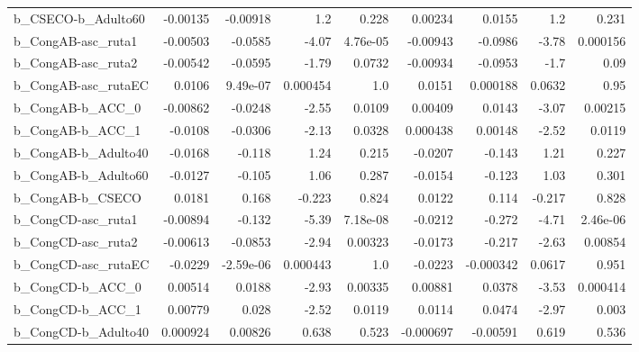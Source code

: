 \begin{tabular}{lrrrrrrrr}
b\_CSECO-b\_Adulto60         &    -0.00135 &     -0.00918 &       1.2 &    0.228 &    0.00234 &      0.0155 &          1.2 &         0.231 \\
b\_CongAB-asc\_ruta1         &    -0.00503 &      -0.0585 &     -4.07 & 4.76e-05 &   -0.00943 &     -0.0986 &        -3.78 &      0.000156 \\
b\_CongAB-asc\_ruta2         &    -0.00542 &      -0.0595 &     -1.79 &   0.0732 &   -0.00934 &     -0.0953 &         -1.7 &          0.09 \\
b\_CongAB-asc\_rutaEC        &      0.0106 &     9.49e-07 &  0.000454 &      1.0 &     0.0151 &    0.000188 &       0.0632 &          0.95 \\
b\_CongAB-b\_ACC\_0           &    -0.00862 &      -0.0248 &     -2.55 &   0.0109 &    0.00409 &      0.0143 &        -3.07 &       0.00215 \\
b\_CongAB-b\_ACC\_1           &     -0.0108 &      -0.0306 &     -2.13 &   0.0328 &   0.000438 &     0.00148 &        -2.52 &        0.0119 \\
b\_CongAB-b\_Adulto40        &     -0.0168 &       -0.118 &      1.24 &    0.215 &    -0.0207 &      -0.143 &         1.21 &         0.227 \\
b\_CongAB-b\_Adulto60        &     -0.0127 &       -0.105 &      1.06 &    0.287 &    -0.0154 &      -0.123 &         1.03 &         0.301 \\
b\_CongAB-b\_CSECO           &      0.0181 &        0.168 &    -0.223 &    0.824 &     0.0122 &       0.114 &       -0.217 &         0.828 \\
b\_CongCD-asc\_ruta1         &    -0.00894 &       -0.132 &     -5.39 & 7.18e-08 &    -0.0212 &      -0.272 &        -4.71 &      2.46e-06 \\
b\_CongCD-asc\_ruta2         &    -0.00613 &      -0.0853 &     -2.94 &  0.00323 &    -0.0173 &      -0.217 &        -2.63 &       0.00854 \\
b\_CongCD-asc\_rutaEC        &     -0.0229 &    -2.59e-06 &  0.000443 &      1.0 &    -0.0223 &   -0.000342 &       0.0617 &         0.951 \\
b\_CongCD-b\_ACC\_0           &     0.00514 &       0.0188 &     -2.93 &  0.00335 &    0.00881 &      0.0378 &        -3.53 &      0.000414 \\
b\_CongCD-b\_ACC\_1           &     0.00779 &        0.028 &     -2.52 &   0.0119 &     0.0114 &      0.0474 &        -2.97 &         0.003 \\
b\_CongCD-b\_Adulto40        &    0.000924 &      0.00826 &     0.638 &    0.523 &  -0.000697 &    -0.00591 &        0.619 &         0.536 \\

\end{tabular}
